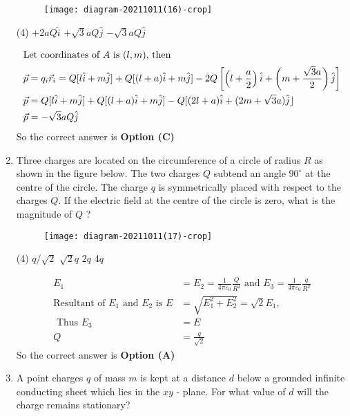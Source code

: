 \begin{enumerate}[label=\color{ocre}\textbf{\arabic*.}]
\begin{figure}[H]
\centering
\texttt{[image: diagram-20211011(16)-crop]}
\caption{}
\label{}
\end{figure}
\begin{tasks}(4)
\task[\textbf{A.}] $+2 a Q \hat{i}$
\task[\textbf{B.}] $+\sqrt{3} a Q \hat{j}$
\task[\textbf{C.}] $-\sqrt{3} a Q \hat{j}$
\end{tasks}
\begin{answer}
\begin{align*}
\intertext{Let coordinates of $A$ is $(l, m)$, then}
\vec{p}&=q_{i} \vec{r}_{i}=Q[l \hat{i}+m \hat{j}]+Q[(l+a) \hat{i}+m \hat{j}]-2 Q\left[\left(l+\frac{a}{2}\right) \hat{i}+\left(m+\frac{\sqrt{3} a}{2}\right) \hat{j}\right]\\
\vec{p}&=Q[l\hat{i}+m \hat{j}]+Q[(l+a) \hat{i}+m \hat{j}]-Q[(2 l+a) \hat{i}+(2 m+\sqrt{3} a) \hat{j}\rfloor \\ \vec{p}&=-\sqrt{3} a Q \hat{j}
\end{align*}
So the correct answer is \textbf{Option (C)}
\end{answer}
\item  Three charges are located on the circumference of a circle of radius $R$ as shown in the figure below. The two charges $Q$ subtend an angle $90^{\circ}$ at the centre of the circle. The charge $q$ is symmetrically placed with respect to the charges $Q$. If the electric field at the centre of the circle is zero, what is the magnitude of $Q$ ?
{}

\begin{figure}[H]
\centering
\texttt{[image: diagram-20211011(17)-crop]}
\end{figure}
\begin{tasks}(4)
\task[\textbf{A.}] $q / \sqrt{2}$
\task[\textbf{B.}] $\sqrt{2} q$
\task[\textbf{C.}] $2 q$
\task[\textbf{D.}] $4 q$
\end{tasks}
\begin{answer}
\begin{align*}
E_{1}&=E_{2}=\frac{1}{4 \pi \varepsilon_{0}} \frac{Q}{R^{2}}\text{ and }E_{3}=\frac{1}{4 \pi \varepsilon_{0}} \frac{q}{R^{2}}\\
\text{Resultant of }E_{1}\text{ and }E_{2}\text{ is }E&=\sqrt{E_{1}^{2}+E_{2}^{2}}=\sqrt{2} E_{1},\\\text{ Thus }E_{3}&=E \\ Q&=\frac{q}{\sqrt{2}}
\end{align*}
So the correct answer is \textbf{Option (A)}
\end{answer}
\item  A point charges $q$ of mass $m$ is kept at a distance $d$ below a grounded infinite conducting sheet which lies in the $x y$ - plane. For what value of $d$ will the charge remains stationary?
{}


\end{enumerate}
